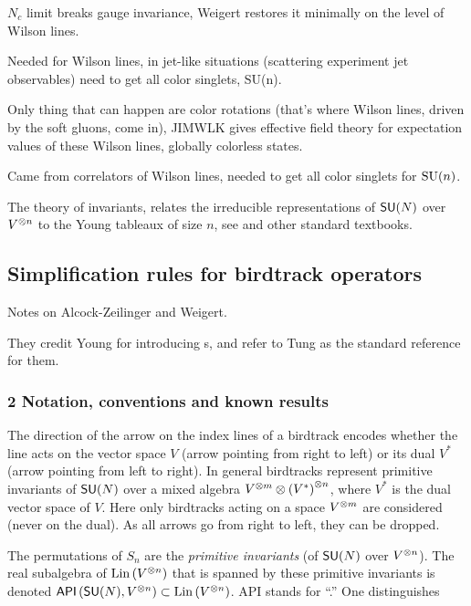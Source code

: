 $N_c$ limit breaks gauge invariance, Weigert restores it minimally on the
level of Wilson lines.

Needed for Wilson lines, in jet-like situations (scattering experiment jet
observables) need to get all color singlets, SU(n).

Only thing that can happen are color rotations (that's where Wilson lines,
driven by the soft gluons, come in), JIMWLK gives effective field theory for
expectation values of these Wilson lines, globally colorless states.

Came from correlators of Wilson lines, needed to get all color singlets for
$\textrm{SU}(n)$.

The theory of invariants,
relates the irreducible representations of $\mathsf{SU}(N)$ over $V^{\otimes n}$
to the Young tableaux of size $n$, see 
and other standard textbooks.


\subsection{Simplification rules for birdtrack operators}
\label{s-AlcZei16-1}

Notes on Alcock-Zeilinger and Weigert.

They credit Young for introducing \Ypo s,
and refer to Tung as the standard reference for them.

\subsubsection{%
2 Notation, conventions and known results}

The direction of the arrow on the index lines of a birdtrack encodes whether
the line acts on the vector space $V$ (arrow pointing from right to left) or
its dual $V^*$ (arrow pointing from left to right).
In general birdtracks represent primitive invariants of $\mathsf{SU}(N)$ over a mixed
algebra $V^{\otimes m}\otimes\left(V^*\right)^{\otimes n}$, where $V^*$ is the dual vector space of $V$.
Here only birdtracks acting on a space $V^{\otimes m}$ are considered (never on the
dual). As all arrows go from right to left, they can be dropped.

The permutations of $S_n$ are the \emph{primitive invariants}
(of $\mathsf{SU}(N)$ over $V^{\otimes n}$).
The real subalgebra of $\mathrm{Lin}\left( V^{\otimes n} \right)$ that is spanned by these primitive
invariants is denoted $\mathsf{API}\left( \mathsf{SU}(N),V^{\otimes n} \right)\subset\mathrm{Lin}\left( V^{\otimes n} \right)$.
{API} stands for ``\api.''
One
distinguishes

